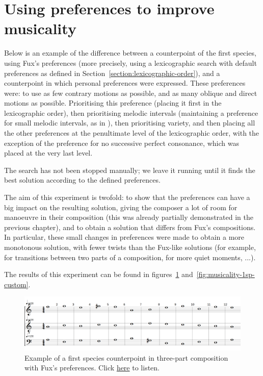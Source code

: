 \section{Using preferences to improve musicality}
Below is an example of the difference between a counterpoint of the first species, using Fux's preferences (more precisely, using a lexicographic search with default preferences as defined in Section~\ref{section:lexicographic-order}), and a counterpoint in which personal preferences were expressed. These preferences were: to use as few contrary motions as possible, and as many oblique and direct motions as possible. Prioritising this preference (placing it first in the lexicographic order), then prioritising melodic intervals (maintaining a preference for small melodic intervals, as in \gap), then prioritising variety, and then placing all the other preferences at the penultimate level of the lexicographic order, with the exception of the preference for no successive perfect consonance, which was placed at the very last level.

The search has not been stopped manually; we leave it running until it finds the best solution according to the defined preferences.

The aim of this experiment is twofold: to show that the preferences can have a big impact on the resulting solution, giving the composer a lot of room for manoeuvre in their composition (this was already partially demonstrated in the previous chapter), and to obtain a solution that differs from Fux's compositions. In particular, these small changes in preferences were made to obtain a more monotonous solution, with fewer twists than the Fux-like solutions (for example, for transitions between two parts of a composition, for more quiet moments, ...).

The results of this experiment can be found in figures~\ref{fig:musicality-1sp-fux} and~\ref{fig:musicality-1sp-custom}.
\begin{figure}[h!]
    \centering
    \includegraphics[width=1\textwidth]{Images/Musicality/musicality-1sp-fux-pref.png}
    \caption{Example of a first species counterpoint in three-part composition with Fux's preferences. Click \href{https://youtu.be/aWmkHdcuook}{here} to listen.}
    \label{fig:musicality-1sp-fux}
\end{figure}


